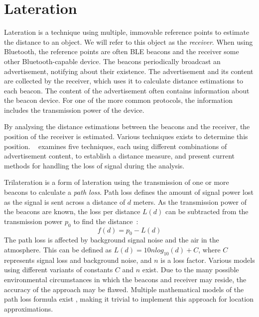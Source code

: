 \section{Lateration}
Lateration is a technique using multiple, immovable reference points to estimate the distance to an object\cite{presence_ble_review}.
We will refer to this object as the \textit{receiver}.
When using Bluetooth, the reference points are often BLE beacons and the receiver some other Bluetooth-capable device. 
The beacons periodically broadcast an advertisement, notifying about their existence.\cite{apple2023ibeacon} 
The advertisement and its content are collected by the receiver, which uses it to calculate distance estimations to each beacon. 
The content of the advertisement often contains information about the beacon device. 
For one of the more common protocols, the information includes the transmission power of the device\cite{apple2023ibeacon}.

By analysing the distance estimations between the beacons and the receiver, the position of the receiver is estimated.
Various techniques exists to determine this position.
\citeauthor{presence_ble_review}~\cite{presence_ble_review} examines five techniques, each using different combinations of advertisement content, to establish a distance measure, and present current methods for handling the loss of signal during the analysis.

Trilateration is a form of lateration using the transmission of one or more beacons to calculate a \textit{path loss}.
Path loss defines the amount of signal power lost as the signal is sent across a distance of $d$ meters.
As the transmission power of the beacons are known, the loss per distance $L(d)$ can be subtracted from the transmission power $p_0$ to find the distance~\cite{taking_localization_to_the_wild}:
\begin{equation}\label{distance_equation}
    f(d) = p_0 - L(d)
\end{equation}
The path loss is affected by background signal noise and the air in the atmosphere.
This can be defined as $L(d) = 10n log_{10}(d)+C$, where $C$ represents signal loss and background noise, and $n$ is a loss factor. \cite{taking_localization_to_the_wild}
Various models using different variants of constants $C$ and $n$ exist\cite{path_loss_models}.
Due to the many possible environmental circumstances in which the beacons and receiver may reside, the accuracy of the approach may be flawed\cite{presence_ble_review}. 
Multiple mathematical models of the path loss formula exist \cite{rssi_indoor_pos,positioning_alg_rssi, RSSI_ZigBee_distance}, making it trivial to implement this approach for location approximations.